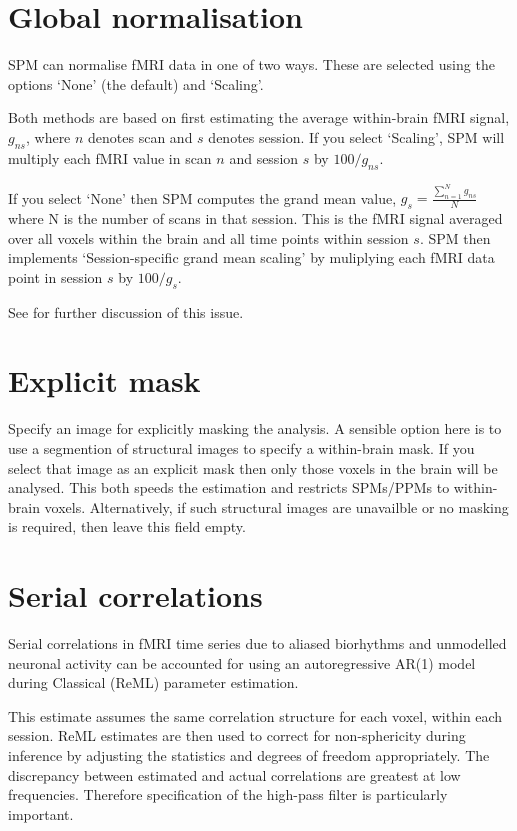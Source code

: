\documentclass[a4paper,titlepage]{book}
\begin{document}
\section{Global normalisation}

SPM can normalise fMRI data in one of two ways. These are 
selected using the options `None' (the default) and `Scaling'. 

Both methods are based on first estimating the average within-brain fMRI signal, $g_{ns}$, where $n$ denotes scan and $s$ denotes session.
If you select `Scaling', SPM will multiply each fMRI value in scan $n$ and session $s$ by $100/g_{ns}$.

If you select `None' then SPM computes the grand mean value, $g_s=\frac{\sum_{n=1}^N g_{ns}}{N}$ where N is the number of scans in that 
session.
This is the fMRI signal averaged over all voxels within the brain and all time points within session $s$. SPM then implements `Session-specific grand mean scaling' by muliplying each fMRI data point in session $s$ by $100/g_s$. 
 
See \cite{ja_global} for further discussion of this issue.


\section{Explicit mask}
Specify an image for explicitly masking the analysis. A sensible option here is to use a segmention of structural images to specify a within-brain mask. If you select that image as an explicit mask then only those voxels in the brain will be analysed. This both speeds the estimation and restricts SPMs/PPMs to within-brain voxels. Alternatively, if such structural images are unavailble or no masking is required, then leave this field empty.


\section{Serial correlations}
Serial correlations in fMRI time series due to aliased biorhythms and unmodelled neuronal activity can be accounted for using an autoregressive AR(1) model during Classical (ReML) parameter estimation.  

                                                                                                            

This estimate assumes the same correlation structure for each voxel, within each session.  ReML estimates are then used to correct for non-sphericity during inference by adjusting the statistics and degrees of freedom appropriately.  The discrepancy between estimated and actual correlations are greatest at low frequencies.  Therefore specification of the high-pass filter is particularly important. 
\end{document}
